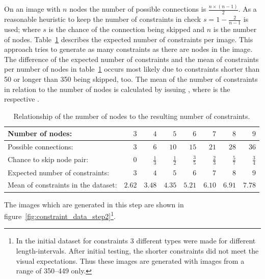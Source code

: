 On an image with \(n\) nodes the number of possible connections is \(\frac{n \times (n-1)}{2}\).
As a reasonable heuristic to keep the number of constraints in check \(s = 1 - \frac{2}{n-1}\) is used; where \(s\) is the chance of the connection being skipped and \(n\) is the number of nodes.
Table~\ref{tab:relation_nodes_constraints} describes the expected number of constraints per image.
This approach tries to generate as many constraints as there are nodes in the image.
The difference of the expected number of constraints and the mean of constraints per number of nodes in table~\ref{tab:relation_nodes_constraints} occurs most likely due to constraints shorter than 50 or longer than 350 being skipped, too.
The mean of the number of constraints in relation to the number of nodes is calculated by issuing , where  is the respective .

\begin{table}
\caption{Relationship of the number of nodes to the resulting number of constraints.}\label{tab:relation_nodes_constraints}
\begin{tabular}{lrrrrrrr}
    \toprule
    Number of nodes: & \(3\) & \(4\) & \(5\) & \(6\) & \(7\) & \(8\) & \(9\) \\
    \midrule
    Possible connections: & \(3\) & \(6\) & \(10\) & \(15\) & \(21\) & \(28\) & \(36\) \\
    \midrule
    Chance to skip node pair: & \(0\) & \(\frac{1}{3}\) & \(\frac{1}{2}\) & \(\frac{3}{5}\) & \(\frac{2}{3}\) & \(\frac{5}{7}\) & \(\frac{3}{4}\) \\
    \midrule
    Expected number of constraints: & \(3\) & \(4\) & \(5\) & \(6\) & \(7\) & \(8\) & \(9\) \\
    \midrule
    Mean of constraints in the dataset: & \(2.62\) & \(3.48\) & \(4.35\) & \(5.21\) & \(6.10\) & \(6.91\) & \(7.78\) \\
    \bottomrule
\end{tabular}
\end{table}

The images which are generated in this step are shown in figure~\ref{fig:constraint_data_step2}\footnote{In the initial dataset for constraints 3 different types were made for different length-intervals. After initial testing, the shorter constraints did not meet the visual expectations. Thus these images are generated with images from a range of 350--449 only.}.

